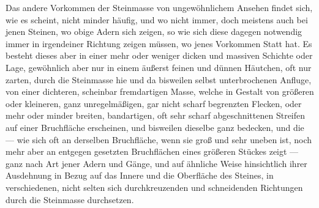\documentclass[a4paper, 11pt, oneside, german]{article}
\begin{document}
Das andere Vorkommen der Steinmasse von ungewöhnlichem Ansehen findet sich, wie es scheint, nicht minder häufig, und wo nicht immer, doch meistens auch bei jenen Steinen, wo obige Adern sich zeigen, so wie sich diese dagegen notwendig immer in irgendeiner Richtung zeigen müssen, wo jenes Vorkommen Statt hat. Es besteht dieses aber in einer mehr oder weniger dicken und massiven Schichte oder Lage, gewöhnlich aber nur in einem äußerst feinen und dünnen Häutchen, oft nur zarten, durch die Steinmasse hie und da bisweilen selbst unterbrochenen Anfluge, von einer dichteren, scheinbar fremdartigen Masse, welche in Gestalt von größeren oder kleineren, ganz unregelmäßigen, gar nicht scharf begrenzten Flecken, oder mehr oder minder breiten, bandartigen, oft sehr scharf abgeschnittenen Streifen auf einer Bruchfläche erscheinen, und bisweilen dieselbe ganz bedecken, und die --- wie sich oft an derselben Bruchfläche, wenn sie groß und sehr uneben ist, noch mehr aber an entgegen gesetzten Bruchflächen eines größeren Stückes zeigt --- ganz nach Art jener Adern und Gänge, und auf ähnliche Weise hinsichtlich ihrer Ausdehnung in Bezug auf das Innere und die Oberfläche des Steines, in verschiedenen, nicht selten sich durchkreuzenden und schneidenden Richtungen durch die Steinmasse durchsetzen.
\end{document}
